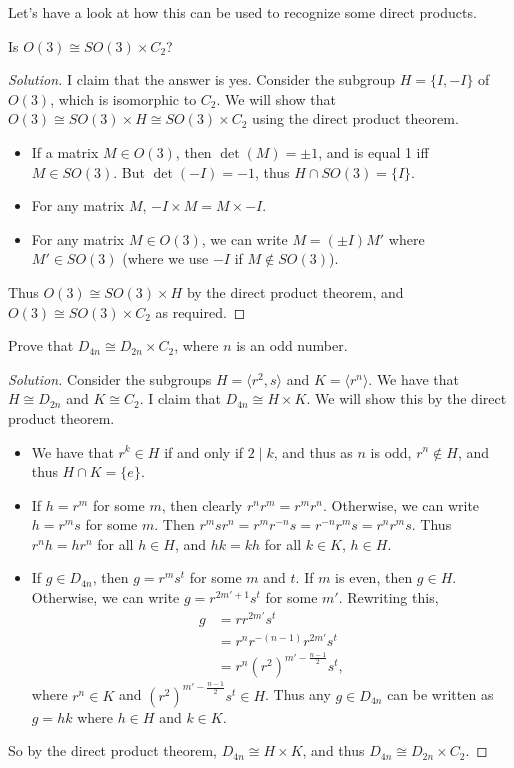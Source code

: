 \documentclass[11pt]{article}
\begin{document}
Let's have a look at how this can be used to recognize some direct products.

\begin{example}
	Is $O(3) \cong SO(3) \times C_2$?
\end{example}
\begin{proof}[Solution]
	I claim that the answer is yes. 
	Consider the subgroup $H = \{I, -I\}$ of $O(3)$, which is isomorphic to $C_2$. We will show that $O(3) \cong SO(3) \times H \cong SO(3) \times C_2$ using the direct product theorem.
	\begin{itemize}
		\item If a matrix $M \in O(3)$, then $\det(M) = \pm 1$, and is equal 1 iff $M \in SO(3)$. But $\det(-I) = -1$, thus $H \cap SO(3) = \{I \}$.
		\item For any matrix $M$, $-I \times M = M \times -I$.
		\item For any matrix $M \in O(3)$, we can write $M = (\pm I) M'$ where $M' \in SO(3)$ (where we use $-I$ if $M \not \in SO(3)$).
	\end{itemize}
	Thus $O(3) \cong SO(3) \times H$ by the direct product theorem, and $O(3) \cong SO(3) \times C_2$ as required.
\end{proof}

\begin{example}\label{ex:dihedral}
	Prove that $D_{4n} \cong D_{2n} \times C_2$, where $n$ is an odd number.
\end{example}
\begin{proof}[Solution]
	Consider the subgroups $H = \langle r^2, s \rangle$ and $K = \langle r^n \rangle$. We have that $H \cong D_{2n}$ and $K \cong C_2$. I claim that $D_{4n} \cong H \times K$. We will show this by the direct product theorem.
	\begin{itemize}
		\item We have that $r^k \in H$ if and only if $2 \mid k$, and thus as $n$ is odd, $r^n \not \in H$, and thus $H \cap K = \{e \}$.
		\item If $h = r^m$ for some $m$, then clearly $r^n r^m = r^m r^n$. Otherwise, we can write $h = r^m s$ for some $m$. Then $r^m s r^n = r^m r^{-n} s = r^{-n} r^m s = r^n r^m s$. Thus $r^n h = h r^n$ for all $h \in H$, and $hk = kh$ for all $k \in K$, $h \in H$.
		\item If $g \in D_{4n}$, then $g = r^m s^t$ for some $m$ and $t$.
		If $m$ is even, then $g \in H$. Otherwise, we can write $g = r^{2m' + 1}s^t$ for some $m'$. Rewriting this,
		\begin{align*}
			g &= r r^{2m'} s^t \\
			  &= r^n r^{-(n - 1)} r^{2m'} s^t  \\
			  &= r^n (r^2)^{m' - \frac{n - 1}{2}} s^t,
		\end{align*}
		where $r^n \in K$ and $(r^2)^{m' - \frac{n - 1}{2}} s^t \in H$. 
		Thus any $g \in D_{4n}$ can be written as $g = hk$ where $h \in H$ and $k \in K$.
	\end{itemize}
	So by the direct product theorem, $D_{4n} \cong H \times K$, and thus $D_{4n} \cong D_{2n} \times C_2$.
\end{proof}
\end{document}
